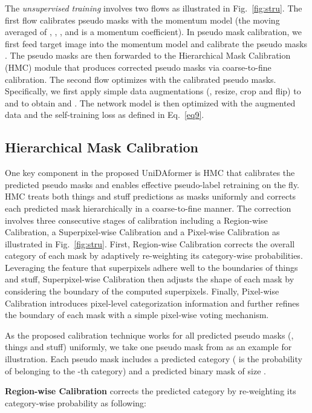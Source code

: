 \documentclass[10pt,twocolumn,letterpaper]{article}
\begin{document}
The \textit{unsupervised training} involves two flows as illustrated in Fig.~\ref{fig:stru}. The first flow calibrates pseudo masks with the momentum model  (the moving averaged of , , , and  is a momentum coefficient). In pseudo mask calibration, we first feed target image  into the momentum model  and calibrate the pseudo masks .
The pseudo masks  are then forwarded to the Hierarchical Mask Calibration (HMC) module that produces corrected pseudo masks  via coarse-to-fine calibration. The second flow optimizes  with the calibrated pseudo masks. Specifically, we first apply simple data augmentations (, resize, crop and flip) to  and  to obtain  and . The network model  is then optimized with the augmented data and the self-training loss  as defined in Eq.~\ref{eq9}.

\subsection{Hierarchical Mask Calibration}

One key component in the proposed UniDAformer is HMC that calibrates the predicted pseudo masks and enables effective pseudo-label retraining on the fly.
HMC treats both things and stuff predictions as masks uniformly and corrects each predicted mask hierarchically in a coarse-to-fine manner. The correction involves three consecutive stages of calibration including a Region-wise Calibration, a Superpixel-wise Calibration and a Pixel-wise Calibration as illustrated in Fig.~\ref{fig:stru}.
First, Region-wise Calibration corrects the overall category of each mask by adaptively re-weighting its category-wise probabilities.
Leveraging the feature that superpixels adhere well to the boundaries of things and stuff, Superpixel-wise Calibration then adjusts the shape of each mask by considering the boundary of the computed superpixels.
Finally, Pixel-wise Calibration introduces pixel-level categorization information and further refines the boundary of each mask with a simple pixel-wise voting mechanism.

As the proposed calibration technique works for all predicted pseudo masks (, things and stuff) uniformly, we take one pseudo mask  from  as an example for illustration. Each pseudo mask  includes a predicted category  ( is the probability of belonging to the -th category) and a predicted binary mask  of size .

\noindent \textbf{Region-wise Calibration} corrects the predicted category  by re-weighting its category-wise probability  as following:
\end{document}
